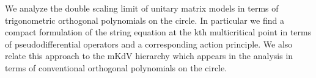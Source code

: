\documentclass[a4paper,10pt]{article}
\begin{document}
\begin{enumerate}
We analyze the double scaling limit of unitary matrix models in terms of trigonometric orthogonal polynomials on the circle. In particular we find a compact formulation of the string equation at the kth multicritical point in terms of pseudodifferential operators and a corresponding action principle. We also relate this approach to the mKdV hierarchy which appears in the analysis in terms of conventional orthogonal polynomials on the circle.
\end{enumerate}
\end{document}

